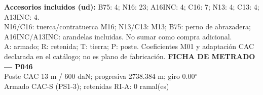 \begingroup\scriptsize
\textbf{Accesorios incluidos (ud):} B75: 4; N16: 23; A16INC: 4; C16: 7; N13: 4; C13: 4; A13INC: 4.\\
N16/C16: tuerca/contratuerca M16; N13/C13: M13; B75: perno de abrazadera; A16INC/A13INC: arandelas incluidas. No sumar como compra adicional.\\
A: armado; R: retenida; T: tierra; P: poste. Coeficientes M01 y adaptación CAC declarada en el catálogo; no es plano de fabricación.
\endgroup\endgroup
\clearpage{}
\begingroup\small\setlength{\parskip}{3pt}\renewcommand{\arraystretch}{1.05}
\textbf{\large FICHA DE METRADO — P046}\\[4pt]
Poste CAC 13 m / 600 daN; progresiva 2738.384 m; giro 0.00\ensuremath{^\circ}\\
Armado CAC-S (PS1-3); retenidas RI-A: 0 ramal(es)\\
\begingroup\scriptsize
